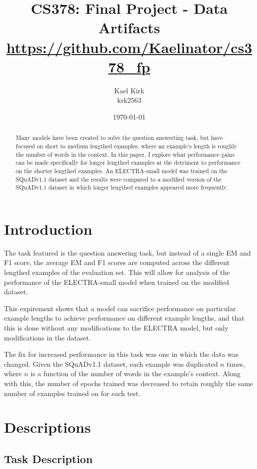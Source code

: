 \documentclass[twocolumn]{article}
\title{CS378: Final Project - Data Artifacts \\ \url{https://github.com/Kaelinator/cs378_fp}}
\author{Kael Kirk \\ krk2563}
\date{\today}
\begin{document}
\maketitle


\begin{abstract}
  Many models have been created to solve the question answerting task, but have focused on short
  to medium lengthed examples, where an example's length is roughly the number of words in the context.
  In this paper, I explore what performance gains can be made specifically
  for longer lengthed examples at the detriment to performance on the shorter lengthed examples.
  An ELECTRA-small model was trained on the SQuADv1.1 dataset and the results were compared to
  a modified version of the SQuADv1.1 dataset in which longer lengthed examples appeared more
  frequently.
\end{abstract}

\section{Introduction}

The task featured is the question answering task, but instead of a single EM and F1 score, the average EM
and F1 scores are computed across the different lengthed examples of the evaluation set.
This will allow for analysis of the performance of the ELECTRA-small model when trained on the modified
dataset. 

This expirement shows that a model can sacrifice performance on particular example lengths to achieve
performance on different example lengths, and that this is done without any modifications to the
ELECTRA model, but only modifications in the dataset.

The fix for increased performance in this task was one in which the data was changed. Given the
SQuADv1.1 dataset, each example was duplicated $n$ times, where $n$ is a function of the number of
words in the example's context. Along with this, the number of epochs trained was decreased to
retain roughly the same number of examples trained on for each test.

\section{Descriptions}

\subsection{Task Description}
\end{document}
